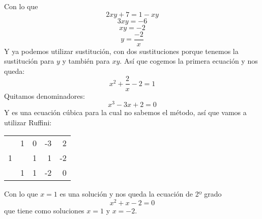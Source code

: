 \documentclass[a4paper,11pt,answers]{exam}
\begin{document}
\begin{questions}
\begin{solution}
      Con lo que
      \[2xy + 7 = 1-xy\]
      \[3xy = -6\]
      \[xy = -2\]
      \[y = \frac{-2}{x}\]
      Y ya podemos utilizar sustitución, con dos sustituciones porque tenemos la sustitución para
      $y$ y también para $xy$. Así que cogemos la primera ecuación y nos queda:
      \[x^2 +\frac{2}{x} -2 = 1\]
      Quitamos denominadores:
      \[x^3 -3x + 2 = 0\]
      Y es una ecuación cúbica para la cual no sabemos el método, así que vamos a utilizar
      Ruffini:
      \begin{center}
        \begin{tabular}{r|rrrr}
          &1&0&-3&2\\
          1&&1&1&-2\\
          \hline
          &1&1&-2&0
        \end{tabular}
      \end{center}
      Con lo que $x=1$ es una solución y nos queda la ecuación de 2º grado
      \[x^2 + x - 2 = 0\]
      que tiene como soluciones $x=1$ y $x = -2$.\\


\end{solution}
\end{questions}
\end{document}
